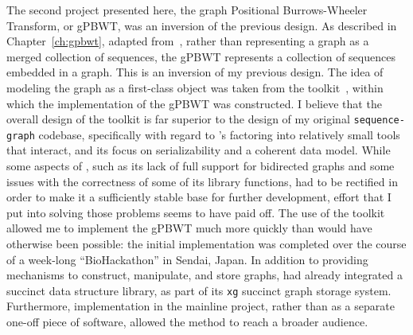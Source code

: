 The second project presented here, the graph Positional Burrows-Wheeler Transform, or gPBWT, was an inversion of the previous design. As described in Chapter~\ref{ch:gpbwt}, adapted from~\citet{novak2016graph}, rather than representing a graph as a merged collection of sequences, the gPBWT represents a collection of sequences embedded in a graph. This is an inversion of my previous design. The idea of modeling the graph as a first-class object was taken from the \vg toolkit~\cite{garrison2016vg}, within which the implementation of the gPBWT was constructed. I believe that the overall design of the \vg toolkit is far superior to the design of my original \texttt{sequence-graph} codebase, specifically with regard to \vg's factoring into relatively small tools that interact, and its focus on serializability and a coherent data model. While some aspects of \vg, such as its lack of full support for bidirected graphs and some issues with the correctness of some of its library functions, had to be rectified in order to make it a sufficiently stable base for further development, effort that I put into solving those problems seems to have paid off. The use of the \vg toolkit allowed me to implement the gPBWT much more quickly than would have otherwise been possible: the initial implementation was completed over the course of a week-long ``BioHackathon'' in Sendai, Japan. In addition to providing mechanisms to construct, manipulate, and store graphs, \vg had already integrated a succinct data structure library, as part of its \texttt{xg} succinct graph storage system. Furthermore, implementation in the mainline \vg project, rather than as a separate one-off piece of software, allowed the method to reach a broader audience.

        
